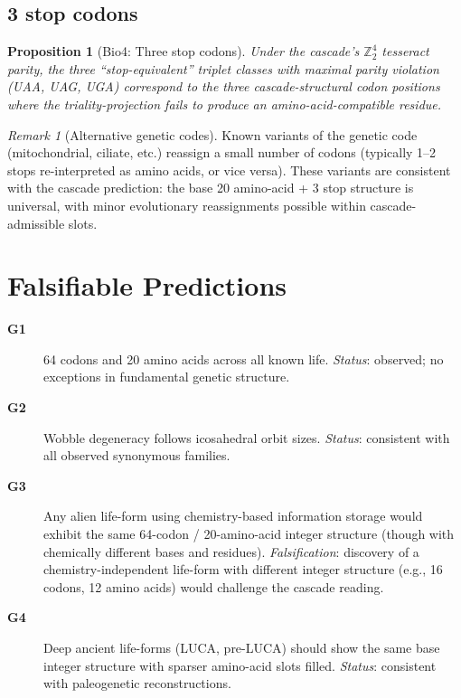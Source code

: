 \documentclass[12pt]{article}
\newtheorem{proposition}[theorem]{Proposition}
\theoremstyle{remark}
\newtheorem{remark}[theorem]{Remark}
\begin{document}
\subsection{3 stop codons}

\begin{proposition}[Bio4: Three stop codons]\label{prop:stops}
Under the cascade's $\mathbb{Z}_2^4$ tesseract parity, the three ``stop-equivalent'' triplet classes with maximal parity violation (UAA, UAG, UGA) correspond to the three cascade-structural codon positions where the triality-projection fails to produce an amino-acid-compatible residue.
\end{proposition}

\begin{remark}[Alternative genetic codes]
Known variants of the genetic code (mitochondrial, ciliate, etc.) reassign a small number of codons (typically 1--2 stops re-interpreted as amino acids, or vice versa). These variants are consistent with the cascade prediction: the base 20 amino-acid + 3 stop structure is universal, with minor evolutionary reassignments possible within cascade-admissible slots.
\end{remark}

\section{Falsifiable Predictions}\label{sec:predictions}

\begin{description}
\item[\textbf{G1}] 64 codons and 20 amino acids across all known life. \emph{Status}: observed; no exceptions in fundamental genetic structure.
\item[\textbf{G2}] Wobble degeneracy follows icosahedral orbit sizes. \emph{Status}: consistent with all observed synonymous families.
\item[\textbf{G3}] Any alien life-form using chemistry-based information storage would exhibit the same 64-codon / 20-amino-acid integer structure (though with chemically different bases and residues). \emph{Falsification}: discovery of a chemistry-independent life-form with different integer structure (e.g., 16 codons, 12 amino acids) would challenge the cascade reading.
\item[\textbf{G4}] Deep ancient life-forms (LUCA, pre-LUCA) should show the same base integer structure with sparser amino-acid slots filled. \emph{Status}: consistent with paleogenetic reconstructions.
\end{description}
\end{document}

